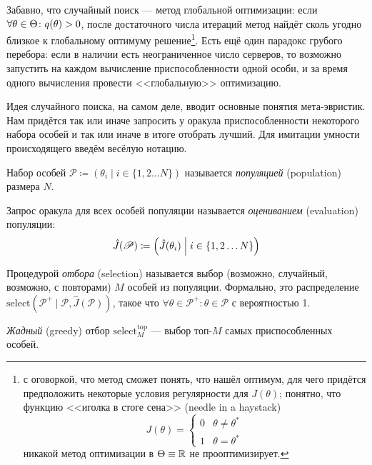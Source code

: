 Забавно, что случайный поиск --- метод глобальной оптимизации: если $\forall \theta \HM\in \Theta \colon q(\theta) \HM> 0$, после достаточного числа итераций метод найдёт сколь угодно близкое к глобальному оптимуму решение\footnote{с оговоркой, что метод сможет понять, что нашёл оптимум, для чего придётся предположить некоторые условия регулярности для $J(\theta)$; понятно, что функцию <<иголка в стоге сена>> (needle in a haystack)
$$J(\theta) = \begin{cases}0 & \theta \neq \theta^* \\ 1 & \theta = \theta^*\end{cases}$$ никакой метод оптимизации в $\Theta \equiv \mathbb{R}$ не прооптимизирует.}. Есть ещё один парадокс грубого перебора: если в наличии есть неограниченное число серверов, то возможно запустить на каждом вычисление приспособленности одной особи, и за время одного вычисления провести <<глобальную>> оптимизацию.

Идея случайного поиска, на самом деле, вводит основные понятия мета-эвристик. Нам придётся так или иначе запросить у оракула приспособленности некоторого набора особей и так или иначе в итоге отобрать лучший. Для имитации умности происходящего введём весёлую нотацию.

\newcommand{\Pop}{\mathscr{P}}
\begin{definition}
Набор особей $\Pop \coloneqq \left( \theta_i \mid i \in \{1, 2 \dots N\} \right) $ называется \emph{популяцией} (population) размера $N$.
\end{definition}

\begin{definition}
Запрос оракула для всех особей популяции называется \emph{оцениванием} (evaluation) популяции:
$$\hat{J}(\Pop) \coloneqq \left( \hat{J}(\theta_i) \Bigm| i \in \{1, 2 \dots N\} \right)$$
\end{definition}

\newcommand{\Sel}{\mathrm{select}}
\begin{definition}
Процедурой \emph{отбора} (selection) называется выбор (возможно, случайный, возможно, с повторами) $M$ особей из популяции. Формально, это распределение $\Sel(\Pop^+ \mid \Pop, \hat{J}(\Pop))$, такое что $\forall \theta \in \Pop^+ \colon \theta \in \Pop$ с вероятностью 1.
\end{definition}

\newcommand{\Seltop}{\Sel^{\mathop{top}}}
\begin{definition}
\emph{Жадный} (greedy) отбор $\Seltop_M$ --- выбор топ-$M$ самых приспособленных особей.
\end{definition}

